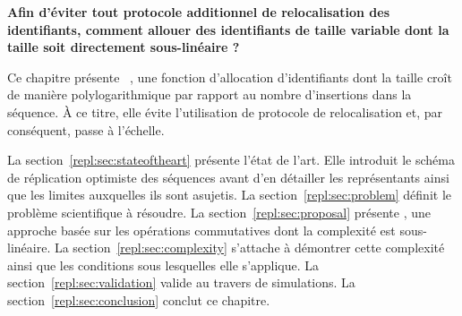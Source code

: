 \textbf{Afin d'éviter tout protocole additionnel de relocalisation des
identifiants, comment allouer des identifiants de taille variable dont la taille
soit directement sous-linéaire ?}

Ce chapitre présente \LSEQ~\cite{nedelec2013concurrency, nedelec2013lseq}, une
fonction d'allocation d'identifiants dont la taille croît de manière
polylogarithmique par rapport au nombre d'insertions dans la séquence. À ce
titre, elle évite l'utilisation de protocole de relocalisation et, par
conséquent, passe à l'échelle.

La section~\ref{repl:sec:stateoftheart} présente l'état de l'art. Elle introduit
le schéma de réplication optimiste des séquences avant d'en détailler les
représentants ainsi que les limites auxquelles ils sont asujetis.  La
section~\ref{repl:sec:problem} définit le problème scientifique à résoudre. La
section~\ref{repl:sec:proposal} présente \LSEQ, une approche basée sur les
opérations commutatives dont la complexité est sous-linéaire. La
section~\ref{repl:sec:complexity} s'attache à démontrer cette complexité ainsi
que les conditions sous lesquelles elle s'applique. La
section~\ref{repl:sec:validation} valide \LSEQ au travers de simulations. La
section~\ref{repl:sec:conclusion} conclut ce chapitre.


